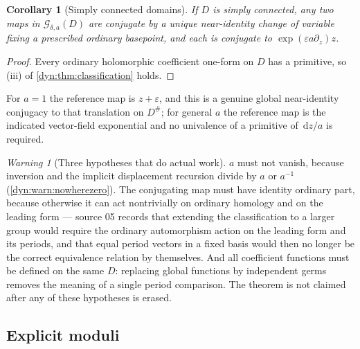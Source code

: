 \documentclass[11pt,letterpaper]{article}
\newtheorem{corollary}[corollary]{Corollary}
\theoremstyle{definition}
\theoremstyle{remark}
\newtheorem{warning}[warning]{Warning}
\newcommand{\GG}{\mathscr G}
\newcommand{\eps}{\varepsilon}
\newcommand{\dd}{\,\mathrm d}
\numberwithin{equation}{section}
\begin{document}
\begin{corollary}[Simply connected domains]\label{dyn:cor:simplyconnected}
If $D$ is simply connected, any two maps in $\GG_{\delta,a}(D)$ are
conjugate by a unique near-identity change of variable fixing a prescribed
ordinary basepoint, and each is conjugate to $\exp(\eps a\partial_z)z$.
\end{corollary}
\begin{proof}
Every ordinary holomorphic coefficient one-form on $D$ has a primitive, so
(iii) of \cref{dyn:thm:classification} holds.
\end{proof}

For $a=1$ the reference map is $z+\eps$, and this is a genuine global
near-identity conjugacy to that translation on $D^{\#}$; for general $a$
the reference map is the indicated vector-field exponential and no
univalence of a primitive of $\dd z/a$ is required.

\begin{warning}[Three hypotheses that do actual work]
\label{dyn:warn:classification}
$a$ must not vanish, because inversion and the implicit displacement
recursion divide by $a$ or $a^{-1}$
(\cref{dyn:warn:nowherezero}). The conjugating map must have identity
ordinary part, because otherwise it can act nontrivially on ordinary
homology and on the leading form --- source 05 records that extending the
classification to a larger group would require the ordinary automorphism
action on the leading form and its periods, and that equal period vectors
in a fixed basis would then no longer be the correct equivalence relation
by themselves. And all coefficient functions must be defined on the same
$D$: replacing global functions by independent germs removes the meaning of
a single period comparison. The theorem is not claimed after any of these
hypotheses is erased.
\end{warning}

\subsection{Explicit moduli}
\end{document}
